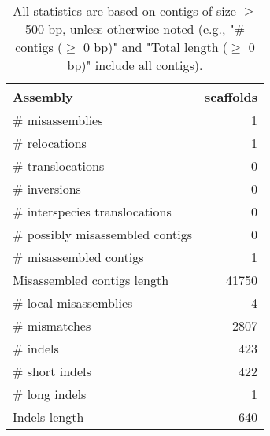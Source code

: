 \documentclass[12pt,a4paper]{article}
\begin{document}
\begin{table}[ht]
\begin{center}
\caption{All statistics are based on contigs of size $\geq$ 500 bp, unless otherwise noted (e.g., "\# contigs ($\geq$ 0 bp)" and "Total length ($\geq$ 0 bp)" include all contigs).}
\begin{tabular}{|l*{1}{|r}|}
\hline
Assembly & scaffolds \\ \hline
\# misassemblies & 1 \\ \hline
\hspace{5mm}\# relocations & 1 \\ \hline
\hspace{5mm}\# translocations & 0 \\ \hline
\hspace{5mm}\# inversions & 0 \\ \hline
\hspace{5mm}\# interspecies translocations & 0 \\ \hline
\# possibly misassembled contigs & 0 \\ \hline
\# misassembled contigs & 1 \\ \hline
Misassembled contigs length & 41750 \\ \hline
\# local misassemblies & 4 \\ \hline
\# mismatches & 2807 \\ \hline
\# indels & 423 \\ \hline
\hspace{5mm}\# short indels & 422 \\ \hline
\hspace{5mm}\# long indels & 1 \\ \hline
Indels length & 640 \\ \hline
\end{tabular}
\end{center}
\end{table}
\end{document}
